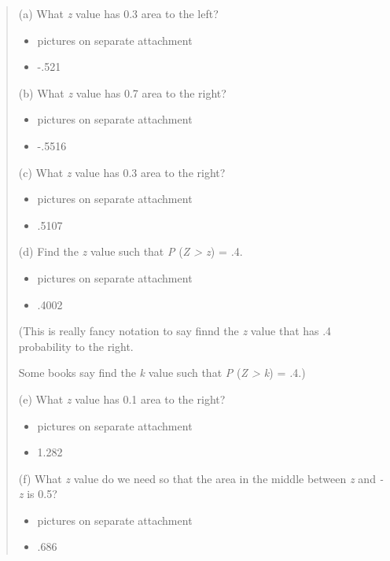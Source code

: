 \documentclass{article}
\begin{document}
\begin{quote}
(a) What \emph{z} value has 0.3 area to the left?
\begin{itemize}
    \item pictures on separate attachment
    \item -.521
\end{itemize}
(b) What \emph{z} value has 0.7 area to the right?
\begin{itemize}
    \item pictures on separate attachment
    \item -.5516
\end{itemize}
(c) What \emph{z} value has 0.3 area to the right?
\begin{itemize}
    \item pictures on separate attachment
    \item .5107
\end{itemize}
(d) Find the \emph{z} value such that \emph{P} (\emph{Z \textgreater{}
z}) = \emph{.}4.
\begin{itemize}
    \item pictures on separate attachment
    \item .4002
\end{itemize}
(This is really fancy notation to say finnd the \emph{z} value that has .4
probability to the right.

Some books say find the \emph{k} value such that \emph{P} (\emph{Z
\textgreater{} k}) = \emph{.}4.)

(e) What \emph{z} value has 0.1 area to the right?
\begin{itemize}
    \item pictures on separate attachment
    \item 1.282
\end{itemize}
(f) What \emph{z} value do we need so that the area in the middle
between \emph{z} and \emph{-z} is 0.5?
\begin{itemize}
    \item pictures on separate attachment
    \item .686
\end{itemize}
\end{quote}
\end{document}
